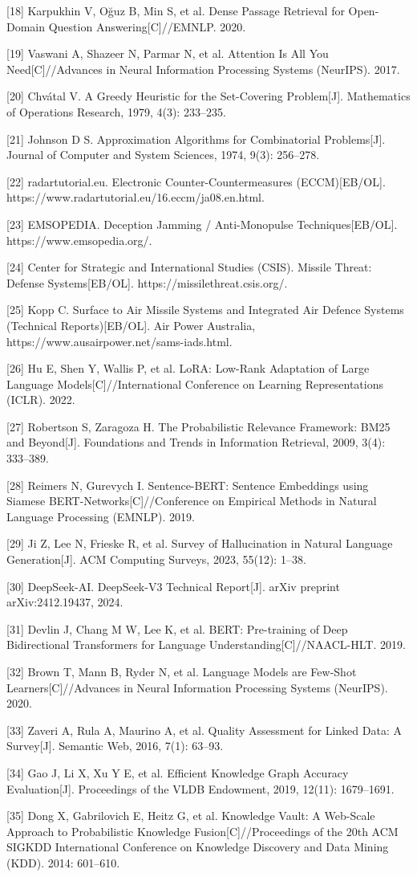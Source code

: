 \documentclass[12pt,a4paper]{ctexart}
\begin{document}
[18] Karpukhin V, Oğuz B, Min S, et al. Dense Passage Retrieval for Open-Domain Question Answering[C]//EMNLP. 2020.

[19] Vaswani A, Shazeer N, Parmar N, et al. Attention Is All You Need[C]//Advances in Neural Information Processing Systems (NeurIPS). 2017.

[20] Chvátal V. A Greedy Heuristic for the Set-Covering Problem[J]. Mathematics of Operations Research, 1979, 4(3): 233–235.

[21] Johnson D S. Approximation Algorithms for Combinatorial Problems[J]. Journal of Computer and System Sciences, 1974, 9(3): 256–278.

[22] radartutorial.eu. Electronic Counter-Countermeasures (ECCM)[EB/OL]. https://www.radartutorial.eu/16.eccm/ja08.en.html.

[23] EMSOPEDIA. Deception Jamming / Anti-Monopulse Techniques[EB/OL]. https://www.emsopedia.org/.

[24] Center for Strategic and International Studies (CSIS). Missile Threat: Defense Systems[EB/OL]. https://missilethreat.csis.org/.

[25] Kopp C. Surface to Air Missile Systems and Integrated Air Defence Systems (Technical Reports)[EB/OL]. Air Power Australia, https://www.ausairpower.net/sams-iads.html.

[26] Hu E, Shen Y, Wallis P, et al. LoRA: Low-Rank Adaptation of Large Language Models[C]//International Conference on Learning Representations (ICLR). 2022.

[27] Robertson S, Zaragoza H. The Probabilistic Relevance Framework: BM25 and Beyond[J]. Foundations and Trends in Information Retrieval, 2009, 3(4): 333–389.

[28] Reimers N, Gurevych I. Sentence-BERT: Sentence Embeddings using Siamese BERT-Networks[C]//Conference on Empirical Methods in Natural Language Processing (EMNLP). 2019.

[29] Ji Z, Lee N, Frieske R, et al. Survey of Hallucination in Natural Language Generation[J]. ACM Computing Surveys, 2023, 55(12): 1–38.

[30] DeepSeek-AI. DeepSeek-V3 Technical Report[J]. arXiv preprint arXiv:2412.19437, 2024.

[31] Devlin J, Chang M W, Lee K, et al. BERT: Pre-training of Deep Bidirectional Transformers for Language Understanding[C]//NAACL-HLT. 2019.

[32] Brown T, Mann B, Ryder N, et al. Language Models are Few-Shot Learners[C]//Advances in Neural Information Processing Systems (NeurIPS). 2020.

[33] Zaveri A, Rula A, Maurino A, et al. Quality Assessment for Linked Data: A Survey[J]. Semantic Web, 2016, 7(1): 63–93.

[34] Gao J, Li X, Xu Y E, et al. Efficient Knowledge Graph Accuracy Evaluation[J]. Proceedings of the VLDB Endowment, 2019, 12(11): 1679–1691.

[35] Dong X, Gabrilovich E, Heitz G, et al. Knowledge Vault: A Web-Scale Approach to Probabilistic Knowledge Fusion[C]//Proceedings of the 20th ACM SIGKDD International Conference on Knowledge Discovery and Data Mining (KDD). 2014: 601–610.
\end{document}
